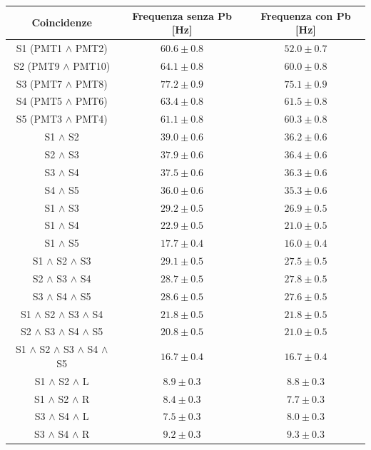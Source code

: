 \documentclass[10pt, oneside, a4paper]{article}   	%
\begin{document}
%
\begin{table}[H]
	\centering
	\begin{tabular}{ccc}
		\toprule
		Coincidenze						&	Frequenza senza Pb [Hz] & Frequenza con Pb [Hz]	\\
		\midrule
		S1 (PMT1 $\wedge$ PMT2)					& $60.6 \pm 0.8$	& $52.0 \pm 0.7$ \\
		S2 (PMT9 $\wedge$ PMT10)				& $64.1 \pm 0.8$	& $60.0 \pm 0.8$ \\
		S3 (PMT7 $\wedge$ PMT8)					& $77.2 \pm 0.9$	& $75.1 \pm 0.9$ \\
		S4 (PMT5 $\wedge$ PMT6)					& $63.4 \pm 0.8$	& $61.5 \pm 0.8$ \\
		S5 (PMT3 $\wedge$ PMT4)					& $61.1 \pm 0.8$	& $60.3 \pm 0.8$ \\
		S1 $\wedge$ S2 						& $39.0 \pm 0.6$	& $36.2 \pm 0.6$ \\
		S2 $\wedge$ S3 						& $37.9 \pm 0.6$    	& $36.4 \pm 0.6$ \\
		S3 $\wedge$ S4 						& $37.5 \pm 0.6$	& $36.3 \pm 0.6$ \\
		S4 $\wedge$ S5 						& $36.0 \pm 0.6$	& $35.3 \pm 0.6$ \\
		S1 $\wedge$ S3 						& $29.2 \pm 0.5$	& $26.9 \pm 0.5$ \\
		S1 $\wedge$ S4 						& $22.9 \pm 0.5$	& $21.0 \pm 0.5$ \\
		S1 $\wedge$ S5 						& $17.7 \pm 0.4$	& $16.0 \pm 0.4$ \\
		S1 $\wedge$ S2 $\wedge$ S3				& $29.1 \pm 0.5$	& $27.5 \pm 0.5$ \\
		S2 $\wedge$ S3 $\wedge$ S4				& $28.7 \pm 0.5$	& $27.8 \pm 0.5$ \\
		S3 $\wedge$ S4 $\wedge$ S5				& $28.6 \pm 0.5$	& $27.6 \pm 0.5$ \\
		S1 $\wedge$ S2 $\wedge$ S3 $\wedge$ S4			& $21.8 \pm 0.5$	& $21.8 \pm 0.5$ \\
		S2 $\wedge$ S3 $\wedge$ S4 $\wedge$ S5			& $20.8 \pm 0.5$	& $21.0 \pm 0.5$ \\
		S1 $\wedge$ S2 $\wedge$ S3 $\wedge$ S4 $\wedge$ S5	& $16.7 \pm 0.4$	& $16.7 \pm 0.4$ \\	
		S1 $\wedge$ S2 $\wedge$ L				& $8.9 \pm 0.3$		& $8.8 \pm 0.3$	\\
		S1 $\wedge$ S2 $\wedge$ R				& $8.4 \pm 0.3$		& $7.7 \pm 0.3$	\\
		S3 $\wedge$ S4 $\wedge$ L				& $7.5 \pm 0.3$		& $8.0 \pm 0.3$	\\
		S3 $\wedge$ S4 $\wedge$ R				& $9.2 \pm 0.3$ 	& $9.3 \pm 0.3$	\\

\end{tabular}
\end{table}
\end{document}
